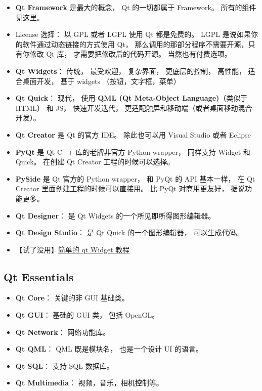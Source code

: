 
\begin{issues}
\issueDraft
\end{issues}

\begin{itemize}
\item \textbf{Qt Framework} 是最大的概念， Qt 的一切都属于 Framework。 所有的组件\href{https://doc.qt.io/qt-6/qtmodules.html}{见这里}。
\item License 选择： 以 GPL 或者 LGPL 使用 Qt 都是免费的。 LGPL 是说如果你的软件通过动态链接的方式使用 Qt， 那么调用的那部分程序不需要开源，只有你修改 Qt 库， 才需要把修改后的代码开源。 当然也有付费选项。
\item \textbf{Qt Widgets}： 传统， 最受欢迎， 复杂界面， 更底层的控制， 高性能， 适合桌面开发， 基于 widgets （按钮，文字框，菜单）
\item \textbf{Qt Quick}： 现代， 使用 \textbf{QML (Qt Meta-Object Language)}（类似于 HTML） 和 JS， 快速开发迭代， 更适配触屏和移动端（或者桌面移动混合开发）。
\item \textbf{Qt Creator} 是 Qt 的官方 IDE。 除此也可以用 Visual Studio 或者 Eclipse
\item \textbf{PyQt} 是 Qt C++ 库的老牌非官方 Python wrapper， 同样支持 Widget 和 Quick。 在创建 Qt Creator 工程的时候可以选择。
\item \textbf{PySide} 是 Qt 官方的 Python wrapper， 和 PyQt 的 API 基本一样， 在 Qt Creator 里面创建工程的时候可以直接用。 比 PyQt 对商用更友好， 据说功能更多。
\item \textbf{Qt Designer}： 是 Qt Widgets 的一个所见即所得图形编辑器。
\item \textbf{Qt Design Studio}： 是 Qt Quick 的一个图形编辑器， 可以生成代码。
\item 【试了没用】\href{https://doc.qt.io/qt-6.4/qtwidgets-tutorials-notepad-example.html}{简单的 qt Widget 教程}
\end{itemize}

\subsection{Qt Essentials}
\begin{itemize}
\item \textbf{Qt Core}： 关键的非 GUI 基础类。
\item \textbf{Qt GUI}： 基础的 GUI 类， 包括 OpenGL。
\item \textbf{Qt Network}： 网络功能库。
\item \textbf{Qt QML}： QML 既是模块名， 也是一个设计 UI 的语言。
\item \textbf{Qt SQL}： 支持 SQL 数据库。
\item \textbf{Qt Multimedia}： 视频，音乐，相机控制等。
\end{itemize}

